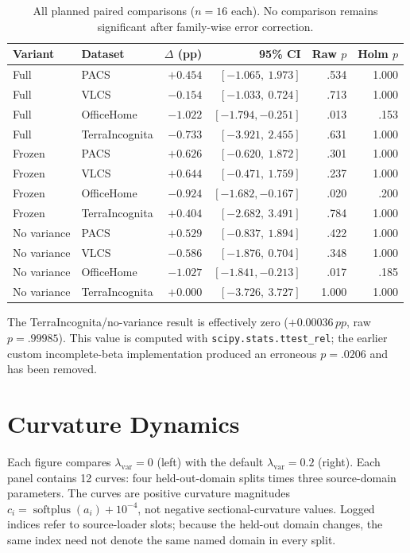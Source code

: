 \documentclass[10pt]{article}
\newcommand{\pp}{\,pp}
\begin{document}
\begin{table}[H]
\centering
\caption{All planned paired comparisons ($n=16$ each). No comparison remains
significant after family-wise error correction.}
\label{tab:all-effects}
\begin{tabular}{llrrrr}
\toprule
Variant & Dataset & $\Delta$ (pp) & 95\% CI & Raw $p$ & Holm $p$ \\
\midrule
Full & PACS           & $+0.454$ & $[-1.065,\ 1.973]$ & .534 & 1.000 \\
Full & VLCS           & $-0.154$ & $[-1.033,\ 0.724]$ & .713 & 1.000 \\
Full & OfficeHome     & $-1.022$ & $[-1.794,-0.251]$  & .013 & .153 \\
Full & TerraIncognita & $-0.733$ & $[-3.921,\ 2.455]$ & .631 & 1.000 \\
\midrule
Frozen & PACS           & $+0.626$ & $[-0.620,\ 1.872]$ & .301 & 1.000 \\
Frozen & VLCS           & $+0.644$ & $[-0.471,\ 1.759]$ & .237 & 1.000 \\
Frozen & OfficeHome     & $-0.924$ & $[-1.682,-0.167]$  & .020 & .200 \\
Frozen & TerraIncognita & $+0.404$ & $[-2.682,\ 3.491]$ & .784 & 1.000 \\
\midrule
No variance & PACS           & $+0.529$ & $[-0.837,\ 1.894]$ & .422 & 1.000 \\
No variance & VLCS           & $-0.586$ & $[-1.876,\ 0.704]$ & .348 & 1.000 \\
No variance & OfficeHome     & $-1.027$ & $[-1.841,-0.213]$  & .017 & .185 \\
No variance & TerraIncognita & $+0.000$ & $[-3.726,\ 3.727]$ & 1.000 & 1.000 \\
\bottomrule
\end{tabular}
\end{table}

The TerraIncognita/no-variance result is effectively zero
($+0.00036\pp$, raw $p=.99985$). This value is computed with
\texttt{scipy.stats.ttest\_rel}; the earlier custom incomplete-beta
implementation produced an erroneous $p=.0206$ and has been removed.

\section{Curvature Dynamics}
\label{sec:trajectories}

Each figure compares $\lambda_{\mathrm{var}}=0$ (left) with the default
$\lambda_{\mathrm{var}}=0.2$ (right). Each panel contains 12 curves: four
held-out-domain splits times three source-domain parameters. The curves are
positive curvature magnitudes $c_i=\operatorname{softplus}(a_i)+10^{-4}$, not
negative sectional-curvature values. Logged indices refer to source-loader
slots; because the held-out domain changes, the same index need not denote the
same named domain in every split.
\end{document}
